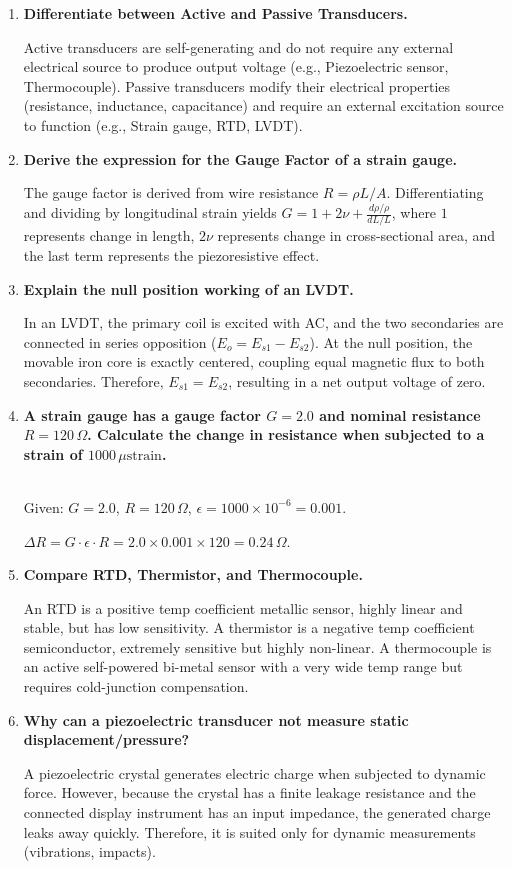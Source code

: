 \documentclass[12pt,a4paper]{article}
\newcommand{\Q}[1]{\textbf{#1}\par\noindent\ignorespaces}
\begin{document}
\begin{tcolorbox}[exambox, title={\textbf{Frequently Asked / Viva Questions}}]
\begin{enumerate}[topsep=0pt, label=\textbf{Q\arabic*.}, itemsep=5pt]
  \item \Q{Differentiate between Active and Passive Transducers.}
    Active transducers are self-generating and do not require any external electrical source to produce output voltage (e.g., Piezoelectric sensor, Thermocouple). Passive transducers modify their electrical properties (resistance, inductance, capacitance) and require an external excitation source to function (e.g., Strain gauge, RTD, LVDT).
  \item \Q{Derive the expression for the Gauge Factor of a strain gauge.}
    The gauge factor is derived from wire resistance $R = \rho L / A$. Differentiating and dividing by longitudinal strain yields $G = 1 + 2\nu + \frac{d\rho/\rho}{dL/L}$, where $1$ represents change in length, $2\nu$ represents change in cross-sectional area, and the last term represents the piezoresistive effect.
  \item \Q{Explain the null position working of an LVDT.}
    In an LVDT, the primary coil is excited with AC, and the two secondaries are connected in series opposition ($E_o = E_{s1} - E_{s2}$). At the null position, the movable iron core is exactly centered, coupling equal magnetic flux to both secondaries. Therefore, $E_{s1} = E_{s2}$, resulting in a net output voltage of zero.
  \item \Q{A strain gauge has a gauge factor $G = 2.0$ and nominal resistance $R = 120\,\Omega$. Calculate the change in resistance when subjected to a strain of $1000\,\mu\text{strain}$.}\\
    Given: $G = 2.0$, $R = 120\,\Omega$, $\epsilon = 1000 \times 10^{-6} = 0.001$.\par
    $\Delta R = G \cdot \epsilon \cdot R = 2.0 \times 0.001 \times 120 = 0.24\,\Omega$.
  \item \Q{Compare RTD, Thermistor, and Thermocouple.}
    An RTD is a positive temp coefficient metallic sensor, highly linear and stable, but has low sensitivity. A thermistor is a negative temp coefficient semiconductor, extremely sensitive but highly non-linear. A thermocouple is an active self-powered bi-metal sensor with a very wide temp range but requires cold-junction compensation.
  \item \Q{Why can a piezoelectric transducer not measure static displacement/pressure?}
    A piezoelectric crystal generates electric charge when subjected to dynamic force. However, because the crystal has a finite leakage resistance and the connected display instrument has an input impedance, the generated charge leaks away quickly. Therefore, it is suited only for dynamic measurements (vibrations, impacts).

\end{enumerate}
\end{tcolorbox}
\end{document}
